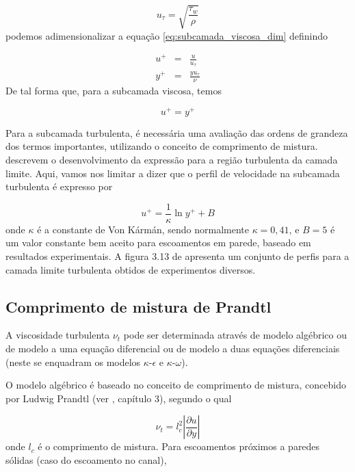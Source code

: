 \documentclass[a4paper,portuguese,10pt]{article}
\renewcommand{\D}{\partial}
\begin{document}
\begin{equation}
  u_{\tau} = \sqrt{\frac{\tau_w}{\rho}}
\end{equation}
podemos adimensionalizar a equação \ref{eq:subcamada_viscosa_dim} definindo

\begin{subequations}
  \begin{eqnarray}
    u^+ &=& \frac{u}{u_{\tau}}\\
    y^+ &=& \frac{yu_{\tau}}{\nu}
  \end{eqnarray}  
\end{subequations}
De tal forma que, para a subcamada viscosa, temos

\begin{equation}
  u^+=y^+
\end{equation}

Para a subcamada turbulenta, é necessária uma avaliação das ordens de grandeza dos termos importantes, utilizando o conceito de comprimento de mistura. \citet{FREIRE02} descrevem o desenvolvimento da expressão para a região turbulenta da camada limite. Aqui, vamos nos limitar a dizer que o perfil de velocidade na subcamada turbulenta é expresso por

\begin{equation}
  u^+=\frac{1}{\kappa}\ln y^+ + B
\end{equation}
onde $\kappa$ é a constante de Von Kármán, sendo normalmente $\kappa=0,41$, e $B = 5$ é um valor constante bem aceito para escoamentos em parede, baseado em resultados experimentais. A figura 3.13 de \citet{FREIRE02} apresenta um conjunto de perfis para a camada limite turbulenta obtidos de experimentos diversos.

\subsection{Comprimento de mistura de Prandtl}

A viscosidade turbulenta $\nu_t$ pode ser determinada através de modelo algébrico ou de modelo a uma equação diferencial ou de modelo a duas equações diferenciais (neste se enquadram os modelos $\kappa$-$\epsilon$ e $\kappa$-$\omega$).

O modelo algébrico é baseado no conceito de comprimento de mistura, concebido por Ludwig Prandtl (ver \citet{FREIRE02}, capítulo 3), segundo o qual

\begin{equation}
  \nu_t = l_c^2\left|\frac{\D u}{\D y}\right|
\end{equation}
onde $l_c$ é o comprimento de mistura. Para escoamentos próximos a paredes sólidas (caso do escoamento no canal), 
\end{document}
